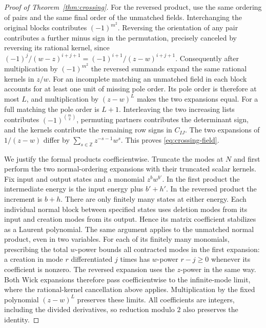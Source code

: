 \begin{proof}[Proof of Theorem~\ref{thm:crossing}]
For the reversed product, use the same ordering of pairs and the
same final order of the unmatched fields. Interchanging the original
blocks contributes $(-1)^{m^2}$. Reversing the orientation of any
pair contributes a further minus sign in the permutation, precisely
canceled by reversing its rational kernel, since
$(-1)^j/(w-z)^{i+j+1}=(-1)^{i+1}/(z-w)^{i+j+1}$. Consequently after
multiplication by $(-1)^{m^2}$ the reversed summands expand the same
rational kernels in $z/w$. For an incomplete matching an unmatched
field in each block accounts for at least one unit of missing pole
order. Its pole order is therefore at most $L$, and multiplication
by $(z-w)^L$ makes the two expansions equal. For a full matching the
pole order is $L+1$. Interleaving the two increasing lists contributes
$(-1)^{\binom m2}$, permuting partners contributes the determinant
sign, and the kernels contribute the remaining row signs in $C_{IJ}$.
The two expansions of $1/(z-w)$ differ by
$\sum_{s\in\mathbb Z}z^{-s-1}w^s$. This proves
\eqref{eq:crossing-field}.

We justify the formal products coefficientwise. Truncate the modes at
$N$ and first
perform the two normal-ordering expansions with their truncated scalar
kernels. Fix input and output states and a monomial $z^b w^{b'}$.
In the first product the intermediate energy is the input energy plus
$b'+h'$. In the reversed product the increment is $b+h$. There are
only finitely many states at either energy. Each individual normal
block between specified states uses deletion modes from its input
and creation modes from its output. Hence its matrix coefficient
stabilizes as a Laurent polynomial. The same argument applies to
the unmatched normal product, even in two variables. For each of its
finitely many monomials, prescribing the total $w$-power bounds all
contracted modes in the first expansion: a creation in mode $r$
differentiated $j$ times has $w$-power $r-j\ge0$ whenever its
coefficient is nonzero. The reversed expansion uses the $z$-power in
the same way. Both Wick expansions therefore pass coefficientwise to
the infinite-mode limit, where the rational-kernel cancellation above
applies. Multiplication by the fixed polynomial $(z-w)^L$ preserves
these limits. All coefficients are integers, including the divided
derivatives, so reduction modulo $2$ also preserves the identity.


\end{proof}
